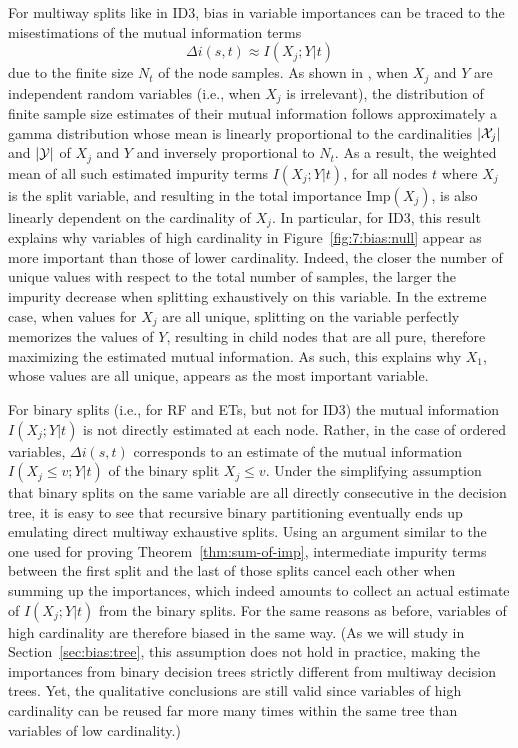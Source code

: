 For multiway splits like in ID3, bias in variable importances can be traced to the
misestimations of the mutual information terms
\begin{equation}
\Delta i(s, t) \approx I(X_j;Y|t)
\end{equation}
due to the finite size $N_t$ of the node samples. As shown in
\citep{goebel:2005}, when $X_j$ and $Y$ are independent random variables (i.e.,
when $X_j$ is irrelevant), the distribution of finite sample size estimates of
their mutual information  follows approximately a gamma distribution whose mean
is linearly proportional to the cardinalities $|{\cal X}_j|$ and $|{\cal Y}|$
of $X_j$ and $Y$ and inversely proportional to $N_t$. As a result, the weighted
mean of all such estimated impurity terms $I(X_j;Y|t)$, for all nodes $t$ where
$X_j$ is the split variable, and resulting in the total importance
$\text{Imp}(X_j)$, is also linearly dependent on the cardinality of $X_j$. In
particular, for ID3, this result explains why variables of high cardinality in
Figure~\ref{fig:7:bias:null} appear as more important than those of lower
cardinality. Indeed, the closer the number of unique values with respect to the
total number of samples, the larger the impurity decrease when splitting
exhaustively on this variable. In the extreme case, when values for $X_j$ are
all unique, splitting on the variable perfectly memorizes the values of $Y$,
resulting in child nodes that are all pure, therefore maximizing the estimated
mutual information. As such, this explains why $X_1$, whose values are all
unique, appears as the most important variable.

For binary splits (i.e., for RF and ETs, but not for ID3) the mutual
information $I(X_j;Y|t)$ is not directly estimated at each node. Rather, in the
case of ordered variables, $\Delta i(s, t)$ corresponds to an estimate of the
mutual information $I(X_j\leq v;Y|t)$ of the binary split $X_j \leq v$. Under
the simplifying assumption that binary splits on the same variable are all
directly consecutive in the decision tree,  it is easy to see that recursive
binary partitioning eventually ends up emulating direct multiway exhaustive
splits. Using an argument similar to the one used for proving
Theorem~\ref{thm:sum-of-imp}, intermediate impurity terms between the first split and the last
of those splits cancel each other when summing up the importances, which indeed
amounts to collect an actual estimate of $I(X_j;Y|t)$ from the binary splits.
For the same reasons as before, variables of high cardinality are therefore
biased in the same way. (As we will study in Section~\ref{sec:bias:tree}, this
assumption does not hold in practice, making the importances from binary
decision trees strictly different from multiway decision trees. Yet, the
qualitative conclusions are still valid since variables of high cardinality can
be reused far more many times within the same tree than variables of low
cardinality.)

